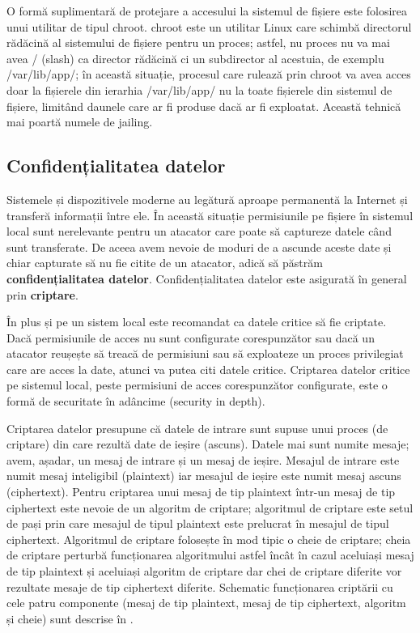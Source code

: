 O formă suplimentară de protejare a accesului la sistemul de fișiere este folosirea unui utilitar de tipul chroot. chroot este un utilitar Linux care schimbă directorul rădăcină al sistemului de fișiere pentru un proces; astfel, nu proces nu va mai avea / (slash) ca director rădăcină ci un subdirector al acestuia, de exemplu /var/lib/app/; în această situație, procesul care rulează prin chroot va avea acces doar la fișierele din ierarhia /var/lib/app/ nu la toate fișierele din sistemul de fișiere, limitând daunele care ar fi produse dacă ar fi exploatat. Această tehnică mai poartă numele de jailing.

\subsection{Confidențialitatea datelor}
\label{sec:sec:confidentiality}

Sistemele și dispozitivele moderne au legătură aproape permanentă la Internet și transferă informații între ele. În această situație permisiunile pe fișiere în sistemul local sunt nerelevante pentru un atacator care poate să captureze datele când sunt transferate. De aceea avem nevoie de moduri de a ascunde aceste date și chiar capturate să nu fie citite de un atacator, adică să păstrăm \textbf{confidențialitatea datelor}. Confidențialitatea datelor este asigurată în general prin \textbf{criptare}.

În plus și pe un sistem local este recomandat ca datele critice să fie criptate. Dacă permisiunile de acces nu sunt configurate corespunzător sau dacă un atacator reușește să treacă de permisiuni sau să exploateze un proces privilegiat care are acces la date, atunci va putea citi datele critice. Criptarea datelor critice pe sistemul local, peste permisiuni de acces corespunzător configurate, este o formă de securitate în adâncime (security in depth).

Criptarea datelor presupune că datele de intrare sunt supuse unui proces (de criptare) din care rezultă date de ieșire (ascuns). Datele mai sunt numite mesaje; avem, așadar, un mesaj de intrare și un mesaj de ieșire. Mesajul de intrare este numit mesaj inteligibil (plaintext) iar mesajul de ieșire este numit mesaj ascuns (ciphertext). Pentru criptarea unui mesaj de tip plaintext într-un mesaj de tip ciphertext este nevoie de un algoritm de criptare; algoritmul de criptare este setul de pași prin care mesajul de tipul plaintext este prelucrat în mesajul de tipul ciphertext. Algoritmul de criptare folosește în mod tipic o cheie de criptare; cheia de criptare perturbă funcționarea algoritmului astfel încât în cazul aceluiași mesaj de tip plaintext și aceluiași algoritm de criptare dar chei de criptare diferite vor rezultate mesaje de tip ciphertext diferite. Schematic funcționarea criptării cu cele patru componente (mesaj de tip plaintext, mesaj de tip ciphertext, algoritm și cheie) sunt descrise în .

